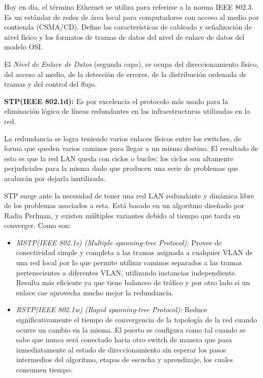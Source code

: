\documentclass[a4paper,10pt]{article}
\begin{document}
Hoy en día, el término Ethernet se utiliza para referirse a la norma IEEE 802.3. Es un estándar de redes de área local para computadores con acceso al medio por contienda (CSMA/CD). Define las características de cableado y señalización de nivel físico y los formatos de tramas de datos del nivel de enlace de datos del modelo OSI.

El \textit{Nivel de Enlace de Datos} (segunda capa), se ocupa del direccionamiento físico, del acceso al medio, de la detección de errores, de la distribución ordenada de tramas y del control del flujo. 
 

\textbf{STP(IEEE 802.1d):} Es por excelencia el protocolo más usado para la eliminación lógica de líneas redundantes en las infraestructuras utilizadas en la red. 

La redundancia se logra teniendo varios enlaces físicos entre los switches, de forma que queden varios caminos para llegar a un mismo destino. El resultado de esto es que la red LAN queda con ciclos o bucles; los ciclos son altamente perjudiciales para la misma dado que producen una serie de problemas que acabarán por dejarla inutilizada.

STP surge ante la necesidad de tener una red LAN redundante y dinámica libre de los problemas asociados a esta.  Está basado en un algoritmo diseñado por Radia Perlman, y existen múltiples variantes debido al tiempo que tarda en converger.  Como son:
\begin{itemize}
	\item\textit{ MSTP(IEEE 802.1s) (Multiple spanning-tree Protocol):} Provee de conectividad simple y completa a las tramas asignada a cualquier VLAN de una red local por lo que permite utilizar caminos separados a las tramas pertenecientes a diferentes VLAN, utilizando instancias independiente. 
	Resulta más eficiente ya que tiene balanceo de tráfico y por otro lado si un enlace cae aprovecha mucho mejor la redundancia.
	\item \textit{RSTP(IEEE 802.1w) (Rapid spanning-tree Protocol):} Reduce significativamente el tiempo de convergencia de la topología de la red cuando ocurre un cambio en la misma. 
	El puerto se configura como tal cuando se sabe que nunca será conectado hacia otro switch de manera que pasa inmediatamente al estado de direccionamiento sin esperar los pasos intermedios del algoritmo, etapas de escucha y aprendizaje, los cuales consumen tiempo.
\end{itemize}
\end{document}
